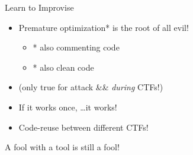 \begin{frame}
  {Learn to Improvise}

  \begin{itemize}
    \item Premature optimization* is the root of all evil!
      \begin{itemize}
        \item * also commenting code
        \item * also clean code
      \end{itemize}
    \item (only true for attack \&\&  \emph{during} CTFs!)
    \item If it works once, \ldots it works!
    \item Code-reuse between different CTFs!
  \end{itemize}

\end{frame}

\begin{frame}[plain]
	\begin{center}
		\huge A fool with a tool is still a fool!
	\end{center}
\end{frame}


